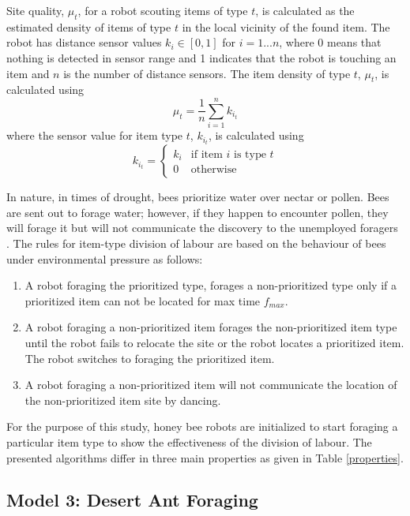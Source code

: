 Site quality, $\mu_t$, for a robot scouting items of type $t$, is calculated as the estimated density of items of type $t$ in the local vicinity of the found item. The robot has distance sensor values $k_i\in[0,1]$ for $ i = 1...n$, where 0 means that nothing is detected in sensor range and 1 indicates that the robot is touching an item and $n$ is the number of distance sensors. The item density of type $t$, $\mu_t$, is calculated using
\begin{equation}
\label{density}
\mu_t = \frac{1}{n}\sum\limits_{i=1}^n k_{i_t}
\end{equation}
where the sensor value for item type $t$, $k_{i_t}$, is calculated using 
\begin{equation}
\label{densitytype}
k_{i_t}=
    \begin{cases}
      k_i & \text{if item $i$ is type $t$} \\
      0 & \text{otherwise}
    \end{cases}
\end{equation}

In nature, in times of drought, bees prioritize water over nectar or pollen. Bees are sent out to forage water; however, if they happen to encounter pollen, they will forage it but will not communicate the discovery to the unemployed foragers  \cite{seeley2009wisdom}. The rules for item-type division of labour are based on the behaviour of bees under environmental pressure as follows:

\begin{enumerate}
\item A robot foraging the prioritized type, forages a non-prioritized type only if a prioritized item can not be located for max time $f_{max}$.
\item A robot foraging a non-prioritized item forages the non-prioritized item type until the robot fails to relocate the site or the robot locates a prioritized item. The robot switches to foraging the prioritized item.
\item A robot foraging a non-prioritized item will not communicate the location of the non-prioritized item site by dancing. 
\end{enumerate}

For the purpose of this study, honey bee robots are initialized to start foraging a particular item type to show the effectiveness of the division of labour. The presented algorithms differ in three main properties as given in Table \ref{properties}.


\subsection{Model 3: Desert Ant Foraging}

